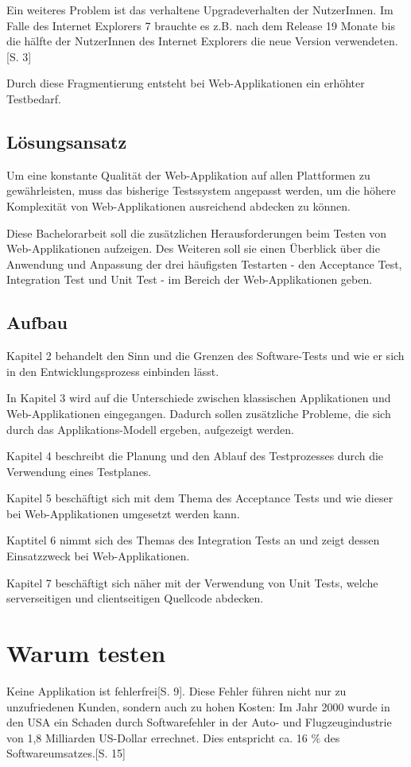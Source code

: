 \documentclass[a4paper,bibtotoc,oneside]{scrbook}
\begin{document}
Ein weiteres Problem ist das verhaltene Upgradeverhalten der NutzerInnen. Im Falle des Internet Explorers 7 brauchte es z.B. nach dem Release 19 Monate bis die hälfte der NutzerInnen des Internet Explorers die neue Version verwendeten. \cite{insecure}[S. 3]

Durch diese Fragmentierung entsteht bei Web-Applikationen ein erhöhter Testbedarf.

\section{Lösungsansatz}
Um eine konstante Qualität der Web-Applikation auf allen Plattformen zu gewährleisten, muss das bisherige Testssystem angepasst werden, um die höhere Komplexität von Web-Applikationen ausreichend abdecken zu können. 

Diese Bachelorarbeit soll die zusätzlichen Herausforderungen beim Testen von Web-Applikationen aufzeigen. Des Weiteren soll sie einen Überblick über die Anwendung und Anpassung der drei häufigsten Testarten - den Acceptance Test, Integration Test und Unit Test - im Bereich der Web-Applikationen geben.


\section{Aufbau}
Kapitel 2 behandelt den Sinn und die Grenzen des Software-Tests und wie er sich in den Entwicklungsprozess einbinden lässt.

In Kapitel 3 wird auf die Unterschiede zwischen klassischen Applikationen und Web-Applikationen eingegangen. Dadurch sollen zusätzliche Probleme, die sich durch das Applikations-Modell ergeben, aufgezeigt werden.

Kapitel 4 beschreibt die Planung und den Ablauf des Testprozesses durch die Verwendung eines Testplanes.

Kapitel 5 beschäftigt sich mit dem Thema des Acceptance Tests und wie dieser bei Web-Applikationen umgesetzt werden kann.

Kaptitel 6 nimmt sich des Themas des Integration Tests an und zeigt dessen Einsatzzweck bei Web-Applikationen.

Kapitel 7 beschäftigt sich näher mit der Verwendung von Unit Tests, welche serverseitigen und clientseitigen Quellcode abdecken.


\chapter{Warum testen}
Keine Applikation ist fehlerfrei\cite{empiric_invest}[S. 9]. Diese Fehler  führen nicht nur zu unzufriedenen Kunden, sondern auch zu hohen Kosten: \glqq Im Jahr 2000 wurde in den USA ein Schaden durch Softwarefehler in der Auto- und Flugzeugindustrie von 1,8 Milliarden US-Dollar errechnet. Dies entspricht ca. 16 \% des Softwareumsatzes.\grqq\cite{betrieb}[S. 15]
\end{document}
